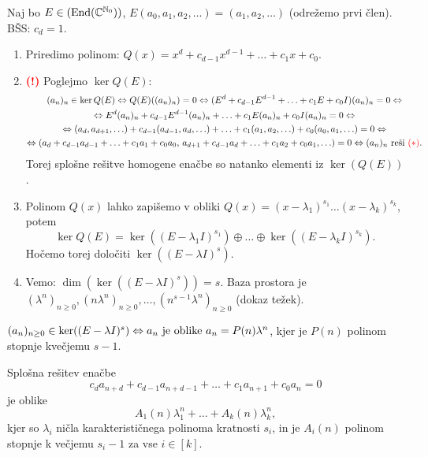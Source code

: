 Naj bo $E \in (\operatorname{End}(\mathbb{C}^{\mathbb{N}_0}))$, $E(a_0, a_1, a_2, \ldots) = (a_1, a_2, \ldots)$ (odrežemo prvi člen). BŠS: $c_d = 1$.
\begin{enumerate}
    \item Priredimo polinom: $Q(x) = x^d + c_{d-1}x^{d-1}+ \ldots + c_1x+c_0$.
    \item \textcolor{red}{\textbf{(!)}} Poglejmo $\ker Q(E)$:
    \begin{multline*}
        (a_n)_{n} \in \ker Q(E) \Leftrightarrow Q(E)((a_n)_n)= 0 \Leftrightarrow (E^d +c_{d-1}E^{d-1}+ \ldots + c_1 E +c_0 I)(a_n)_n = 0 \Leftrightarrow \\ \Leftrightarrow E^d(a_n)_n +c_{d-1}E^{d-1}(a_n)_n + \ldots +  c_1E(a_n)_n + c_0 I (a_n)_n = 0 \Leftrightarrow \\ \Leftrightarrow (a_d, a_{d+1}, \ldots) + c_{d-1}(a_{d-1}, a_d, \ldots) + \ldots + c_1(a_1, a_2, \ldots) + c_0 (a_0, a_1, \ldots) = 0 \Leftrightarrow \\ \Leftrightarrow (a_d +c_{d-1}a_{d-1} + \ldots + c_1a_1 + c_0a_0, \, a_{d+1}+c_{d-1}a_d + \ldots + c_1a_2 + c_0 a_1, \ldots) = 0 \Leftrightarrow (a_n)_n \text{ reši } \textcolor{red}{(*)}.
      \end{multline*}
      Torej splošne rešitve homogene enačbe so natanko elementi iz $\ker(Q(E))$.
      \item Polinom $Q(x)$ lahko zapišemo v obliki $Q(x) = (x-\lambda_1)^{s_1} \ldots (x-\lambda_k)^{s_k}$, potem       
      $$\ker Q(E) = \ker((E - \lambda_1I)^{s_1}) \oplus \ldots \oplus \ker((E - \lambda_kI)^{s_k}).$$
      Hočemo torej določiti $\ker ((E - \lambda I)^{s})$.
      \item Vemo: $\dim (\ker ((E - \lambda I)^{s})) = s$. Baza prostora je $(\lambda^n)_{n \geq 0}, (n\lambda^n)_{n \geq 0}, \ldots, (n^{s-1}\lambda^n)_{n \geq 0}$ (dokaz težek).
\end{enumerate}
\begin{izrek}
    $(a_n)_{n \geq 0} \in \ker ((E - \lambda I)^s) \Leftrightarrow a_n \text{ je oblike } a_n = P(n) \lambda^n$, kjer je $P(n)$ polinom stopnje kvečjemu $s-1$.
\end{izrek}

\begin{izrek}
    Splošna rešitev enačbe 
    $$c_da_{n+d} + c_{d-1}a_{n+d-1} + \ldots + c_1 a _{n+1} + c_0 a_n = 0$$
    je oblike 
    $$A_1(n) \lambda_1^n + \ldots + A_k(n) \lambda_k^n,$$
    kjer so $\lambda_i$ ničla karakterističnega polinoma kratnosti $s_i$, in je $A_i(n)$ polinom stopnje k večjemu $s_i - 1$ za vse $i \in [k]$.
\end{izrek}

